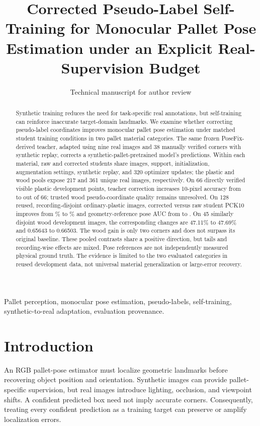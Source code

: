 \documentclass[journal]{IEEEtran}
\title{Corrected Pseudo-Label Self-Training for Monocular Pallet Pose Estimation under an Explicit Real-Supervision Budget}
\author{Technical manuscript for author review}
\begin{document}
\maketitle
\begin{abstract}
Synthetic training reduces the need for task-specific real annotations, but self-training can reinforce inaccurate target-domain landmarks. We examine whether correcting pseudo-label coordinates improves monocular pallet pose estimation under matched student training conditions in two pallet material categories. The same frozen PoseFix-derived teacher, adapted using nine real images and 38 manually verified corners with synthetic replay, corrects a synthetic-pallet-pretrained model's predictions. Within each material, raw and corrected students share images, support, initialization, augmentation settings, synthetic replay, and 320 optimizer updates; the plastic and wood pools expose 217 and 361 unique real images, respectively. On 66 directly verified visible plastic development points, teacher correction increases 10-pixel accuracy from \AnchorRaw{} to \AnchorCorr{} out of 66; trusted wood pseudo-coordinate quality remains unresolved. On 128 reused, recording-disjoint ordinary-plastic images, corrected versus raw student PCK10 improves from \RawPCK{}\% to \CorrPCK{}\% and geometry-reference pose AUC from \RawAUC{} to \CorrAUC{}. On 45 similarly disjoint wood development images, the corresponding changes are 47.11\% to 47.69\% and 0.65643 to 0.66503. The wood gain is only two corners and does not surpass its original baseline. These pooled contrasts share a positive direction, but tails and recording-wise effects are mixed. Pose references are not independently measured physical ground truth. The evidence is limited to the two evaluated categories in reused development data, not universal material generalization or large-error recovery.
\end{abstract}
\begin{IEEEkeywords}
Pallet perception, monocular pose estimation, pseudo-labels, self-training, synthetic-to-real adaptation, evaluation provenance.
\end{IEEEkeywords}

\section{Introduction}
An RGB pallet-pose estimator must localize geometric landmarks before recovering object position and orientation. Synthetic images can provide pallet-specific supervision, but real images introduce lighting, occlusion, and viewpoint shifts. A confident predicted box need not imply accurate corners. Consequently, treating every confident prediction as a training target can preserve or amplify localization errors.
\end{document}

